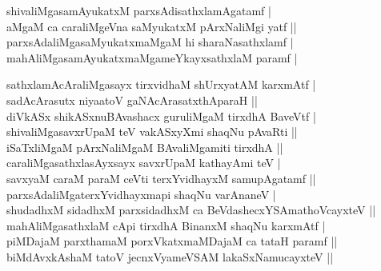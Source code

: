 \begin{entry}
\begin{shl}
shivaliMgasamAyukatxM parxsAdisathxlamAgatamf |\\[2pt]
aMgaM ca caraliMgeVna saMyukatxM pArxNaliMgi yatf ||\\[2pt]
parxsAdaliMgasaMyukatxmaMgaM hi sharaNasathxlamf |\\[2pt]
mahAliMgasamAyukatxmaMgameYkayxsathxlaM paramf |\\[-1pt]
\end{shl}
\medskip
{}
\smallskip
{}
\medskip
\begin{shl}
sathxlamAcAraliMgasayx tirxvidhaM shUrxyatAM karxmAtf |\\[2pt]
sadAcArasutx niyaatoV gaNAcArasatxthAparaH ||\\[2pt]
diVkASx shikASxnuBAvashacx guruliMgaM tirxdhA BaveVtf |\\[2pt]
shivaliMgasavxrUpaM teV vakASxyXmi shaqNu pAvaRti ||\\[2pt]
iSaTxliMgaM pArxNaliMgaM BAvaliMgamiti tirxdhA ||\\[2pt]
caraliMgasathxlasAyxsayx savxrUpaM kathayAmi teV |\\[2pt]
savxyaM caraM paraM ceVti terxYvidhayxM samupAgatamf ||\\[2pt]
parxsAdaliMgaterxYvidhayxmapi shaqNu varAnaneV |\\[2pt]
shudadhxM sidadhxM parxsidadhxM ca BeVdashecxYSAmathoVcayxteV ||\\[2pt]
mahAliMgasathxlaM cApi tirxdhA BinanxM shaqNu karxmAtf |\\[2pt]
piMDajaM parxthamaM porxVkatxmaMDajaM ca tataH paramf ||\\[2pt]
biMdAvxkAshaM tatoV jecnxVyameVSAM lakaSxNamucayxteV ||\\[-1pt]
\end{shl}
\medskip
{}
\smallskip
{}
\medskip
\begin{shl}

\end{shl}
\end{entry}
